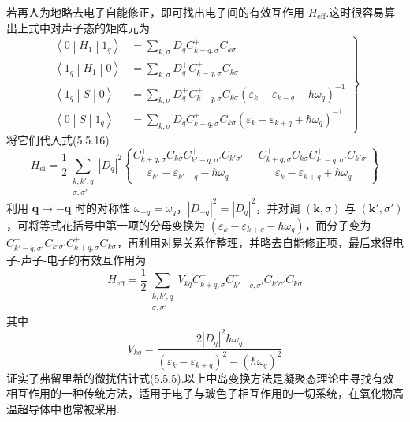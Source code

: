 若再人为地略去电子自能修正，即可找出电子间的有效互作用 $H_{\mathrm{eff}}$.这时很容易算出上式中对声子态的矩阵元为
\begin{equation}
  \left.\begin{aligned}
  \left\langle 0\middle|H_1\middle|1_q\right\rangle&=\sum_{k,\sigma}D_qC_{k+q,\sigma}^{+}C_{k\sigma}\\
  \left\langle 1_q\middle|H_1\middle|0\right\rangle&=\sum_{k,\sigma}D_q^{+}C_{k-q,\sigma}^{+}C_{k\sigma}\\
  \left\langle 1_q\middle|S\middle|0\right\rangle&=\sum_{k,\sigma}D_q^{+}C_{k-q,\sigma}^{+}C_{k\sigma}
  \left(\varepsilon_k-\varepsilon_{k-q}-\hbar\omega_q\right)^{-1}\\
  \left\langle 0\middle|S\middle|1_q\right\rangle&=\sum_{k,\sigma}D_qC_{k+q,\sigma}^{+}C_{k\sigma}
  \left(\varepsilon_k-\varepsilon_{k+q}+\hbar\omega_q\right)^{-1}
  \end{aligned}\right\}
\end{equation}
将它们代入式(5.5.16)
\begin{equation}
  H_{\mathrm{el}}=\frac{1}{2}\sum_{\substack{k,k',q\\ \sigma,\sigma'}}\left|D_q\right|^2
  \left\{\frac{C_{k+q,\sigma}^{+}C_{k\sigma}C_{k'-q,\sigma'}^{+}C_{k'\sigma'}}
  {\varepsilon_{k'}-\varepsilon_{k'-q}-\hbar\omega_q}
  -\frac{C_{k+q,\sigma}^{+}C_{k\sigma}C_{k'-q,\sigma'}^{+}C_{k'\sigma'}}
  {\varepsilon_k-\varepsilon_{k+q}+\hbar\omega_q}\right\}
\end{equation}
利用 $\boldsymbol{q}\to-\boldsymbol{q}$ 时的对称性 $\omega_{-q}=\omega_q$，$\left|D_{-q}\right|^2=\left|D_q\right|^2$，并对调 $\left(\boldsymbol{k},\sigma\right)$ 与 $\left(\boldsymbol{k}',\sigma'\right)$，可将等式花括号中第一项的分母变换为 $\left(\varepsilon_k-\varepsilon_{k+q}-\hbar\omega_q\right)$，而分子变为 $C_{k'-q,\sigma'}^{+}C_{k'\sigma'}C_{k+q,\sigma}^{+}C_{k\sigma}$，再利用对易关系作整理，并略去自能修正项，最后求得电子-声子-电子的有效互作用为
\begin{equation}
  H_{\mathrm{eff}}=\frac{1}{2}\sum_{\substack{k,k',q\\ \sigma,\sigma'}}V_{kq}
  C_{k+q,\sigma}^{+}C_{k'-q,\sigma'}^{+}C_{k'\sigma'}C_{k\sigma}
\end{equation}
其中
\begin{equation}
  V_{kq}=\frac{2\left|D_q\right|^2\hbar\omega_q}
  {\left(\varepsilon_k-\varepsilon_{k+q}\right)^2-\left(\hbar\omega_q\right)^2}
\end{equation}
证实了弗留里希的微扰估计式(5.5.5).以上中岛变换方法是凝聚态理论中寻找有效相互作用的一种传统方法，适用于电子与玻色子相互作用的一切系统，在氧化物高温超导体中也常被采用.

